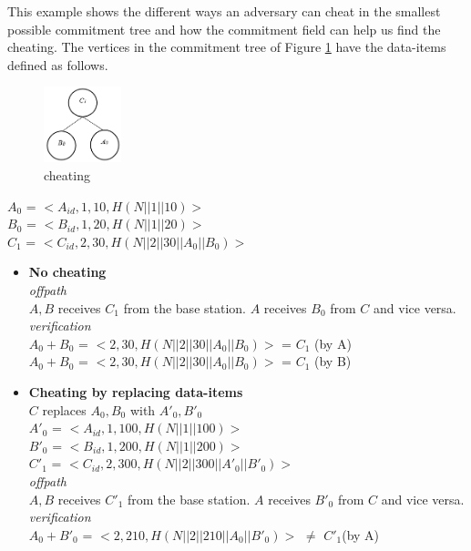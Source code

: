 \begin{exmp}
	This example shows the different ways an adversary can cheat in the smallest possible commitment tree and how the commitment field can help us find the cheating.
	The vertices in the commitment tree of Figure \ref{fig:cheating} have the data-items defined as follows.\\
	\begin{figure}[t]
		\centering
		\includegraphics[width=0.2\textwidth]{images/commitment-tree-2.png}
		\caption{cheating}
		\label{fig:cheating}
	\end{figure}	
	$A_{0}$ = $<A_{id},1,10, H(N||1||10)>$\\
	$B_{0}$ = $<B_{id},1,20, H(N||1||20)>$\\
	$C_{1}$ = $<C_{id},2,30, H(N||2||30||A_{0}||B_{0})>$\\
	\begin{itemize}
	\item \textbf{No cheating}\\
		\textit{offpath}\\
			$A,B$ receives $C_{1}$ from the base station.
			$A$ receives $B_{0}$ from $C$ and vice versa.\\
		\textit{verification}\\
			$A_{0} + B_{0}$ = $<2,30,H(N||2||30||A_{0}||B_{0})>$ = $C_{1}$ (by A)\\
			$A_{0} + B_{0}$ = $<2,30,H(N||2||30||A_{0}||B_{0})>$ = $C_{1}$ (by B)\\
	\item \textbf{Cheating by replacing data-items}\\
		$C$ replaces $A_{0},B_{0}$ with $A'_{0},B'_{0}$\\
		$A'_{0}$ = $<A_{id},1,100, H(N||1||100)>$\\
		$B'_{0}$ = $<B_{id},1,200, H(N||1||200)>$\\
		$C'_{1}$ = $<C_{id},2,300, H(N||2||300||A'_{0}||B'_{0})>$\\
		\textit{offpath}\\
			$A,B$ receives $C'_{1}$ from the base station.
			$A$ receives $B'_{0}$ from $C$ and vice versa.\\
		\textit{verification}\\
			$A_{0}+B'_{0}$ = $<2,210,H(N||2||210||A_{0}||B'_{0})>$ $\neq$ $C'_{1}$(by A)\\

\end{itemize}
\end{exmp}
